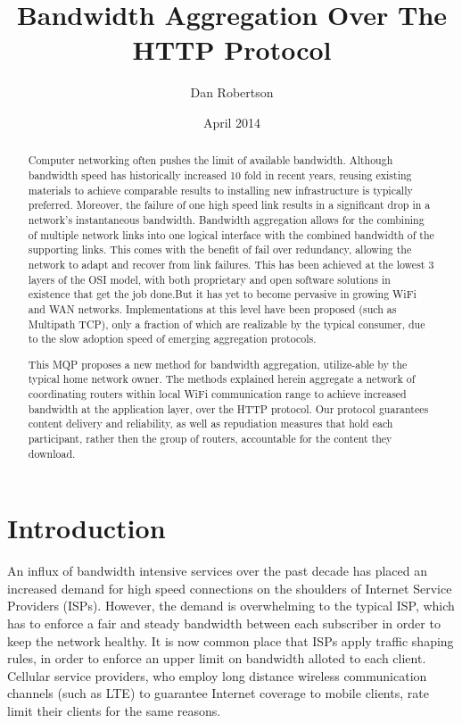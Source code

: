 \documentclass[12pt]{article}
\begin{document}
\title{Bandwidth Aggregation Over The HTTP Protocol}
\author{Dan Robertson}
\date{April 2014}
\maketitle

\begin{abstract}
	Computer networking often pushes the limit of available bandwidth. Although bandwidth speed has historically increased 10 fold in recent years, reusing existing materials to achieve comparable results to installing new infrastructure is typically preferred. Moreover, the failure of one high speed link results in a significant drop in a network's instantaneous bandwidth. Bandwidth aggregation allows for the combining of multiple network links into one logical interface with the combined bandwidth of the supporting links. This comes with the benefit of fail over redundancy, allowing the network to adapt and recover from link failures. This has been achieved at the lowest 3 layers of the OSI model, with both proprietary and open software solutions in existence that get the job done.But it has yet to become pervasive in growing WiFi and WAN networks. Implementations at this level have been proposed (such as Multipath TCP), only a fraction of which are realizable by the typical consumer, due to the slow adoption speed of emerging aggregation protocols.

	This MQP proposes a new method for bandwidth aggregation, utilize-able by the typical home network owner. The methods explained herein aggregate a network of coordinating routers within local WiFi communication range to achieve increased bandwidth at the application layer, over the HTTP protocol. Our protocol guarantees content delivery and reliability, as well as repudiation measures that hold each participant, rather then the group of routers, accountable for the content they download.
\end{abstract}


\newpage
\section{Introduction}

	An influx of bandwidth intensive services over the past decade has placed an increased demand for high speed connections on the shoulders of Internet Service Providers (ISPs). However, the demand is overwhelming to the typical ISP, which has to enforce a fair and steady bandwidth between each subscriber in order to keep the network healthy. It is now common place that ISPs apply traffic shaping rules, in order to enforce an upper limit on bandwidth alloted to each client. Cellular service providers, who employ long distance wireless communication channels (such as LTE) to guarantee Internet coverage to mobile clients, rate limit their clients for the same reasons. 
\end{document}
